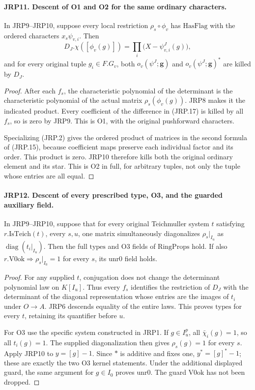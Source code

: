 \documentclass[11pt,a4paper]{article}
\numberwithin{equation}{section}
\theoremstyle{remark}\newtheorem{remark}[theorem]{Remark}
\begin{document}
\paragraph{JRP11. Descent of O1 and O2 for the same ordinary characters.}
\label{claim:JRP11}
In JRP9--JRP10, suppose every local restriction
\(\rho_s\circ\phi_v\) has \(\mathrm{HasFlag}\) with the
ordered characters \(x_s\psi_{v,i}\).  Then
\[
 D_J.\chi([\phi_v(g)])=
                  \prod_i\bigl(X-\psi^J_{v,i}(g)\bigr),
 \tag{JRP.17}
\]
and for every original tuple \(g_i\in F.G_v\), both
\(o_v(\psi^J;\mathbf g)\) and
\(o_v(\psi^J;\mathbf g)^*\) are killed by \(D_J\).
\begin{proof}
After each \(f_s\), the characteristic polynomial of the
determinant is the characteristic polynomial of the actual matrix
\(\rho_s(\phi_v(g))\).  JRP8 makes it the indicated product.
Every coefficient of the difference in (JRP.17) is killed by all
\(f_s\), so is zero by JRP9.  This is O1, with the original
pushforward characters.

Specializing (JRP.2) gives the ordered product of matrices in the
second formula of (JRP.15), because coefficient maps preserve each
individual factor and its order.  This product is zero.  JRP10
therefore kills both the original ordinary element and its star.
This is O2 in full, for arbitrary tuples, not only the tuple whose
entries are all equal.
\end{proof}

\paragraph{JRP12. Descent of every prescribed type, O3, and the guarded auxiliary field.}
\label{claim:JRP12}
In JRP9--JRP10, suppose that for every original Teichmuller
system \(t\) satisfying \(r.\mathrm{IsTeich}(t)\), every
\(s,u\), one matrix simultaneously diagonalizes
\(\rho_s|_{I_u}\) as \(\operatorname{diag}(t_i|_{I_u})\).
Then the full \(\mathrm{types}\) and O3 fields of
\(\mathrm{RingProps}\) hold.  If also
\(r.\mathrm{V0ok}\Rightarrow\rho_s|_{I_0}=1\) for every
\(s\), its \(\mathrm{unr0}\) field holds.
\begin{proof}
For any supplied \(t\), conjugation does not change the
determinant polynomial law on \(K[I_u]\).  Thus every
\(f_s\) identifies the restriction of \(D_J\) with the
determinant of the diagonal representation whose entries are the
images of \(t_i\) under \(O\to A\).  JRP6 descends equality
of the entire laws.  This proves \(\mathrm{types}\) for every
\(t\), retaining its quantifier before \(u\).

For O3 use the specific system constructed in JRP1.  If
\(g\in I^p_u\), all \(\bar\chi_i(g)=1\), so all
\(t_i(g)=1\).  The supplied diagonalization then gives
\(\rho_s(g)=1\) for every \(s\).  Apply JRP10 to
\(y=[g]-1\).  Since \(*\) is additive and fixes one,
\(y^*=[g]^*-1\); these are exactly the two O3 kernel
statements.  Under the additional displayed guard, the same
argument for \(g\in I_0\) proves \(\mathrm{unr0}\).
The guard \(\mathrm{V0ok}\) has not been dropped.
\end{proof}
\end{document}
